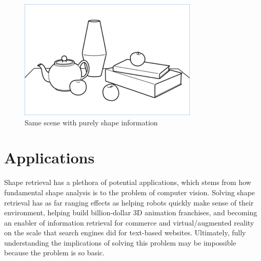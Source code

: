\documentclass[../tech_report_1.tex]{subfiles}
\begin{document}
\begin{figure}[H]
	\centering
	\includegraphics{still_life_outline}
	\caption{Same scene with purely shape information\label{figure:still_life_outline}}
\end{figure}


\section{Applications}

Shape retrieval has a plethora of potential applications, which stems from how fundamental shape analysis is to the problem of computer vision. Solving shape retrieval has as far ranging effects as helping robots quickly make sense of their environment, helping build billion-dollar 3D animation franchises, and becoming an enabler of information retrieval for commerce and virtual/augmented reality on the scale that search engines did for text-based websites. Ultimately, fully understanding the implications of solving this problem may be impossible because the problem is so basic.
\end{document}
